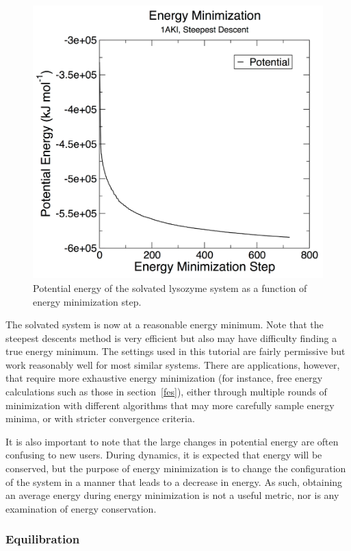 \documentclass[9pt,tutorial,pubversion]{livecoms}
\begin{document}
\begin{figure}[h]
\centering
\includegraphics{plot_lyso_em_potential}
\caption{Potential energy of the solvated lysozyme system as a function of energy minimization step.}
\label{lyso_em_fig}
\end{figure}

The solvated system is now at a reasonable energy minimum. Note that the steepest descents method is very efficient but also may have difficulty finding a true energy minimum. The settings used in this tutorial are fairly permissive but work reasonably well for most similar systems. There are applications, however, that require more exhaustive energy minimization (for instance, free energy calculations such as those in section~\ref{fes}), either through multiple rounds of minimization with different algorithms that may more carefully sample energy minima, or with stricter convergence criteria.

It is also important to note that the large changes in potential energy are often confusing to new users. During dynamics, it is expected that energy will be conserved, but the purpose of energy minimization is to change the configuration of the system in a manner that leads to a decrease in energy. As such, obtaining an average energy during energy minimization is not a useful metric, nor is any examination of energy conservation.

\subsubsection{Equilibration} \label{lyso_equil}
\end{document}
